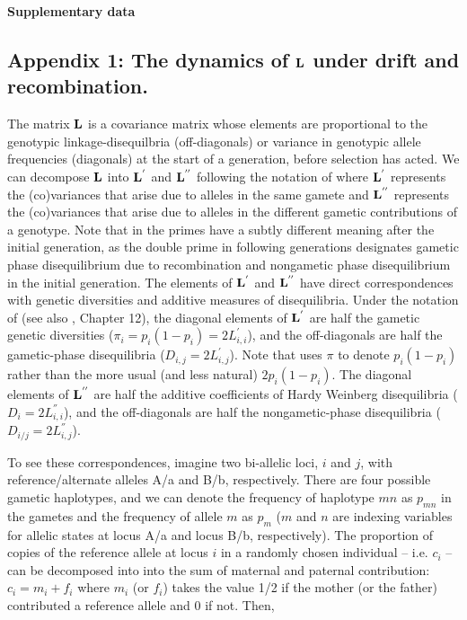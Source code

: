 \documentclass[12pt]{article}
\begin{document}
\newpage
{\Large \bf Supplementary data}


\begin{bibunit}

\setcounter{equation}{0}
    \renewcommand{\theequation}{S\arabic{equation}}
    \setcounter{figure}{0}
    \renewcommand{\thefigure}{S\arabic{figure}}
    \setcounter{section}{0}
    \renewcommand{\thesection}{S\arabic{section}}

    
\section{Appendix 1: The dynamics of ${\bf L}$ under drift and recombination.} \label{Appendix:LD}

The matrix ${\bf L}$ is a covariance matrix whose elements are proportional to the genotypic linkage-disequilbria (off-diagonals) or variance in genotypic allele frequencies (diagonals) at the start of a generation, before selection has acted. We can decompose  ${\bf L}$ into ${\bf L}^{'}$ and ${\bf L}^{''}$ following the notation of \citet{buffalo2019linked} where ${\bf L}^{'}$ represents the (co)variances that arise due to alleles in the same gamete and ${\bf L}^{''}$ represents the (co)variances that arise due to alleles in the different gametic contributions of a genotype. Note that in \citet{Santiago.1998} the primes have a subtly different meaning after the initial generation, as the double prime in following generations designates gametic phase disequilibrium due to recombination and nongametic phase disequilibrium in the initial generation. The elements of ${\bf L}^{'}$ and ${\bf L}^{''}$ have direct correspondences with genetic diversities and additive measures of disequilibria. Under the notation of \citet{Weir.1989} (see also \citet{bulmer1980mathematical}, Chapter 12), the diagonal elements of ${\bf L}^{'}$ are half the gametic genetic diversities ($\pi_i=p_i(1-p_i)=2L^{'}_{i,i}$), and the off-diagonals are half the gametic-phase disequilibria ($D_{i,j}=2L^{'}_{i,j}$). Note that \citet{Weir.1989} uses $\pi$ to denote $p_i(1-p_i)$ rather than the more usual (and less natural) $2p_i(1-p_i)$. The diagonal elements of ${\bf L}^{''}$ are half the additive coefficients of Hardy Weinberg disequilibria ($D_{i}=2L^{''}_{i,i}$), and the off-diagonals are half the nongametic-phase disequilibria ($D_{i/j}=2L^{''}_{i,j}$). 

To see these correspondences, imagine two bi-allelic loci, $i$ and $j$, with reference/alternate alleles A/a and B/b, respectively. There are four possible gametic haplotypes, and we can denote the frequency of haplotype $mn$ as $p_{mn}$ in the gametes and the frequency of allele $m$ as $p_m$ ($m$ and $n$ are indexing variables for allelic states at locus A/a and locus B/b, respectively). The proportion of copies of the reference allele at locus $i$ in a randomly chosen individual -- i.e. $c_i$ -- can be decomposed into into the sum of maternal and paternal contribution: $c_i = m_i+f_i$ where $m_i$ (or $f_i$) takes the value 1/2 if the mother (or the father) contributed a reference allele and 0 if not. Then,


\end{bibunit}
\end{document}
